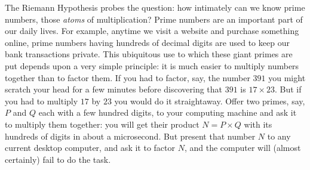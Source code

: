 \documentclass[openany]{book}
\theoremstyle{plain}
\theoremstyle{definition}
\newcommand{\RH}{Riemann Hypothesis\index{Riemann Hypothesis}}
\begin{document}
                        
The \RH{} probes the question: how intimately can we know
prime numbers, those {\em atoms} of multiplication?  Prime numbers are
an important part of our daily lives.  For example, anytime we visit a
website and purchase something online, prime numbers having hundreds of
decimal digits are used to keep our bank transactions private.  This
ubiquitous use to which these giant primes are put depends upon a very
simple principle: it is much easier to multiply numbers together than
to factor them. If you had to factor, say, the number $391$ you might
scratch your head for a few minutes before discovering that $391$ is
$17\times 23$. But if you had to multiply $17$ by $23$ you would do it
straightaway.  Offer two primes, say, $P$ and $Q$ each with a few hundred 
digits, to your computing machine and ask it to multiply them
together: you will get their product $N = P\times Q$ with its hundreds of digits
in about a microsecond. But present that number $N$ to any
current desktop computer, and ask it to factor $N$, and the computer
will (almost certainly) fail to do the task.
\end{document}
